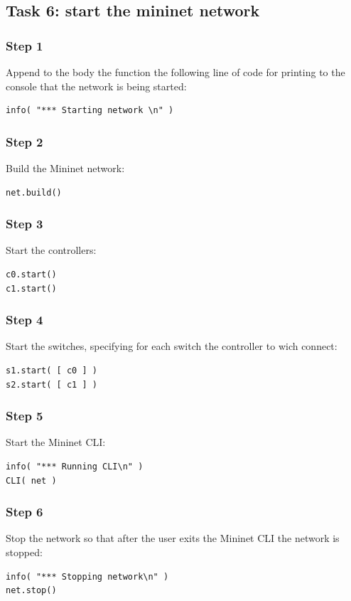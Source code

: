 \subsection*{Task 6: start the mininet network}
\subsubsection*{Step 1}
Append to the body the function  the following line
of code for printing to the console that the network is being started:
\begin{lstlisting}
info( "*** Starting network \n" )
\end{lstlisting}

\subsubsection*{Step 2}
Build the Mininet network:
\begin{lstlisting}
net.build()
\end{lstlisting}

\subsubsection*{Step 3}
Start the controllers:
\begin{lstlisting}
c0.start()
c1.start()
\end{lstlisting}

\subsubsection*{Step 4}
Start the switches, specifying for each switch the controller to wich connect:
\begin{lstlisting}
s1.start( [ c0 ] )
s2.start( [ c1 ] )
\end{lstlisting}

\subsubsection*{Step 5}
Start the Mininet CLI:
\begin{lstlisting}
info( "*** Running CLI\n" )
CLI( net )
\end{lstlisting}

\subsubsection*{Step 6}
Stop the network so that after the user exits the Mininet CLI the network is
stopped:
\begin{lstlisting}
info( "*** Stopping network\n" )
net.stop()
\end{lstlisting}

